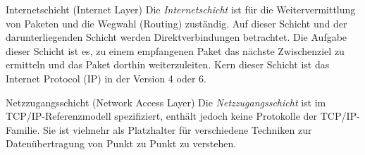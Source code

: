 \begin{defi}{Internetschicht (Internet Layer)}
    Die \emph{Internetschicht} ist für die Weitervermittlung von Paketen und die Wegwahl (Routing) zuständig.
    Auf dieser Schicht und der darunterliegenden Schicht werden Direktverbindungen betrachtet.
    Die Aufgabe dieser Schicht ist es, zu einem empfangenen Paket das nächste Zwischenziel zu ermitteln und das Paket dorthin weiterzuleiten.
    Kern dieser Schicht ist das Internet Protocol (IP) in der Version 4 oder 6.
\end{defi}

\begin{defi}{Netzzugangsschicht (Network Access Layer)}
    Die \emph{Netzzugangsschicht} ist im TCP/IP-Referenzmodell spezifiziert, enthält jedoch keine Protokolle der TCP/IP-Familie.
    Sie ist vielmehr als Platzhalter für verschiedene Techniken zur Datenübertragung von Punkt zu Punkt zu verstehen.
\end{defi}